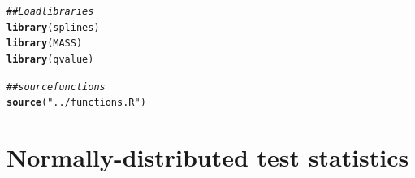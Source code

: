 \documentclass{article}\usepackage[]{graphicx}\usepackage[]{color}
\makeatletter
\newcommand{\hlstr}[1]{\textcolor[rgb]{0.192,0.494,0.8}{#1}}%
\newcommand{\hlcom}[1]{\textcolor[rgb]{0.678,0.584,0.686}{\textit{#1}}}%
\newcommand{\hlstd}[1]{\textcolor[rgb]{0.345,0.345,0.345}{#1}}%
\newcommand{\hlkwd}[1]{\textcolor[rgb]{0.737,0.353,0.396}{\textbf{#1}}}%
\newenvironment{kframe}{%
 \def\at@end@of@kframe{}%
 \ifinner\ifhmode%
  \def\at@end@of@kframe{\end{minipage}}%
  \begin{minipage}{\columnwidth}%
 \fi\fi%
 \def\FrameCommand##1{\hskip\@totalleftmargin \hskip-\fboxsep
 \colorbox{shadecolor}{##1}\hskip-\fboxsep
     \hskip-\linewidth \hskip-\@totalleftmargin \hskip\columnwidth}%
 \MakeFramed {\advance\hsize-\width
   \@totalleftmargin\z@ \linewidth\hsize
   \@setminipage}}%
 {\par\unskip\endMakeFramed%
 \at@end@of@kframe}
\newenvironment{knitrout}{}{} %
\makeatother
\begin{document}
\begin{knitrout}
\color{fgcolor}\begin{kframe}
\begin{alltt}
\hlcom{## Load libraries}
\hlkwd{library}\hlstd{(splines)}
\hlkwd{library}\hlstd{(MASS)}
\hlkwd{library}\hlstd{(qvalue)}

\hlcom{##source functions}
\hlkwd{source}\hlstd{(}\hlstr{"../functions.R"}\hlstd{)}
\end{alltt}
\end{kframe}
\end{knitrout}

\section{Normally-distributed test statistics}
\end{document}
